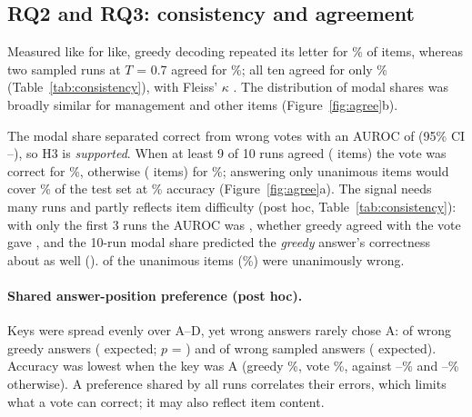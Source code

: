 \subsection{RQ2 and RQ3: consistency and agreement}
Measured like for like, greedy decoding repeated its letter for \rerunSamePct\% of items, whereas two sampled runs at
$T$ = 0.7 agreed for \pairAgree\%; all ten agreed for only \unanimity\% (Table~\ref{tab:consistency}), with Fleiss'
$\kappa$ \kappaRuns. The distribution of modal shares was broadly similar for management and other items
(Figure~\ref{fig:agree}b).

The modal share separated correct from wrong votes with an AUROC of \auroc{} (95\% CI \aurocLo--\aurocHi), so H3 is
\emph{supported}. When at least 9 of 10 runs agreed (\nGeNine{} items) the vote was correct for \accGeNine\%, otherwise
(\nLtNine{} items) for \accLtNine\%; answering only unanimous items would cover \coverageTen\% of the test set at
\accTen\% accuracy (Figure~\ref{fig:agree}a). The signal needs many runs and partly reflects item difficulty (post hoc,
Table~\ref{tab:consistency}): with only the first 3 runs the AUROC was \aurocFirstThree, whether greedy agreed with the
vote gave \aurocGreedyAgree, and the 10-run modal share predicted the \emph{greedy} answer's correctness about as well
(\aurocGreedyCorrect). \unanimousWrong{} of the \unanimousN{} unanimous items (\unanimousWrongPct\%) were unanimously
wrong.

\paragraph{Shared answer-position preference (post hoc).} Keys were spread evenly over A--D, yet wrong answers rarely
chose A: \wrongAGreedy{} of \wrongGreedyN{} wrong greedy answers (\wrongAGreedyExp{} expected; $p$ = \wrongLettersP) and
\wrongASampled{} of \wrongSampledN{} wrong sampled answers (\wrongASampledExp{} expected). Accuracy was lowest when the key
was A (greedy \accGreedyKeyA\%, vote \accVoteKeyA\%, against \accGreedyKeyOtherMin--\accGreedyKeyOtherMax\% and
\accVoteKeyOtherMin--\accVoteKeyOtherMax\% otherwise). A preference shared by all runs correlates their errors, which
limits what a vote can correct; it may also reflect item content.

\begin{table}[t]
\caption{RQ2 and RQ3 for the 10 sampled runs at $T$ = 0.7 (\nTest{} items); percentile bootstrap CIs over items.}
\label{tab:consistency}
\footnotesize

\end{table}

